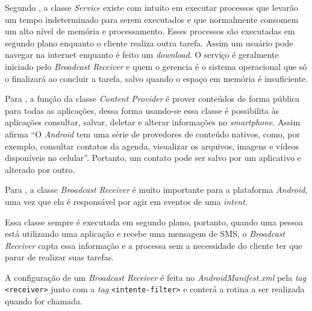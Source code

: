 	\par Segundo , a classe \textit{Service} existe
com intuito em executar processos que levarão um tempo indeterminado para serem
executados e que normalmente consomem um alto nível de memória e processamento.
Esses processos são executadas em segundo plano enquanto o cliente realiza
outra tarefa. Assim um usuário pode navegar na internet enquanto é feito um
\textit{download}. O serviço é geralmente iniciado pelo \textit{Broadcast
Receiver} e quem o gerencia é o sistema operacional que só o finalizará ao
concluir a tarefa, salvo quando o espaço em memória é insuficiente.

	\par Para , a função da classe \textit{Content
Provider} é prover conteúdos de forma pública para todas as aplicações, dessa
forma usando-se essa classe é possibilita às aplicações consultar, salvar,
deletar e alterar informações no \textit{smartphone}. Assim afirma
 “O \textit{Android} tem uma série de provedores
de conteúdo nativos, como, por exemplo, consultar contatos da agenda,
visualizar os arquivos, imagens e vídeos disponíveis no celular”. Portanto, um
contato pode ser salvo por um aplicativo e alterado por outro.

	\par Para , a classe \textit{Broadcast Receiver}
é muito importante para a plataforma \textit{Android}, uma vez que ela é
responsável por agir em eventos de uma \textit{intent}.

	\par Essa classe sempre é executada em segundo plano, portanto, quando uma
pessoa está utilizando uma aplicação e recebe uma mensagem de SMS, o
\textit{Broadcast Receiver} capta essa informação e a processa sem a
necessidade do cliente ter que parar de realizar suas tarefas.

	\par A configuração de um \textit{Broadcast Receiver} é feita no
\textit{AndroidManifest.xml} pela \textit{tag} \texttt{<receiver>} junto com a
\textit{tag} \texttt{<intente-filter>} e conterá a rotina a ser realizada quando
for chamada. 


